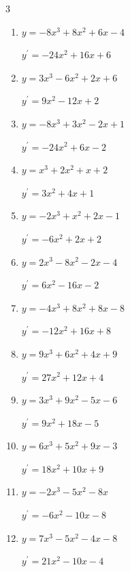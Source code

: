 \begin{multicols}{3}
\begin{enumerate}
        $\displaystyle y^{\prime}=-12x^{2}-6x+4$

  \item $y=-8x^{3}+8x^{2}+6x-4$

        $\displaystyle y^{\prime}=-24x^{2}+16x+6$

  \item $y=3x^{3}-6x^{2}+2x+6$

        $\displaystyle y^{\prime}=9x^{2}-12x+2$

  \item $y=-8x^{3}+3x^{2}-2x+1$

        $\displaystyle y^{\prime}=-24x^{2}+6x-2$

  \item $y=x^{3}+2x^{2}+x+2$

        $\displaystyle y^{\prime}=3x^{2}+4x+1$

  \item $y=-2x^{3}+x^{2}+2x-1$

        $\displaystyle y^{\prime}=-6x^{2}+2x+2$

  \item $y=2x^{3}-8x^{2}-2x-4$

        $\displaystyle y^{\prime}=6x^{2}-16x-2$

  \item $y=-4x^{3}+8x^{2}+8x-8$

        $\displaystyle y^{\prime}=-12x^{2}+16x+8$

  \item $y=9x^{3}+6x^{2}+4x+9$

        $\displaystyle y^{\prime}=27x^{2}+12x+4$

  \item $y=3x^{3}+9x^{2}-5x-6$

        $\displaystyle y^{\prime}=9x^{2}+18x-5$

  \item $y=6x^{3}+5x^{2}+9x-3$

        $\displaystyle y^{\prime}=18x^{2}+10x+9$

  \item $y=-2x^{3}-5x^{2}-8x$

        $\displaystyle y^{\prime}=-6x^{2}-10x-8$

  \item $y=7x^{3}-5x^{2}-4x-8$

        $\displaystyle y^{\prime}=21x^{2}-10x-4$

\columnbreak %

\resetques


\end{enumerate}
\end{multicols}

